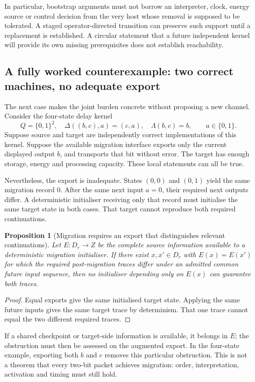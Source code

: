 \documentclass[11pt,a4paper]{article}
\newtheorem{proposition}[theorem]{Proposition}
\theoremstyle{definition}
\theoremstyle{remark}
\begin{document}
In particular, bootstrap arguments must not borrow an interpreter, clock, energy source or control decision from the very host whose removal is supposed to be tolerated. A staged operator-directed transition can preserve such support until a replacement is established. A circular statement that a future independent kernel will provide its own missing prerequisites does not establish reachability.

\subsection{A fully worked counterexample: two correct machines, no adequate export}\label{subsec:exportcase}
The next case makes the joint burden concrete without proposing a new channel. Consider the four-state delay kernel
\[
 Q=\{0,1\}^2,\quad \Delta((b,c),a)=(c,a),\quad \Lambda(b,c)=b,
 \qquad a\in\{0,1\}.
\]
Suppose source and target are independently correct implementations of this kernel. Suppose the available migration interface exports only the current displayed output $b$, and transports that bit without error. The target has enough storage, energy and processing capacity. These local statements can all be true.

Nevertheless, the export is inadequate. States $(0,0)$ and $(0,1)$ yield the same migration record $0$. After the same next input $a=0$, their required next outputs differ. A deterministic initialiser receiving only that record must initialise the same target state in both cases. That target cannot reproduce both required continuations.

\begin{proposition}[Migration requires an export that distinguishes relevant continuations]\label{prop:export}
Let $E:D_r\to Z$ be the complete source information available to a deterministic migration initialiser. If there exist $x,x'\in D_r$ with $E(x)=E(x')$ for which the required post-migration traces differ under an admitted common future input sequence, then no initialiser depending only on $E(x)$ can guarantee both traces.
\end{proposition}
\begin{proof}
Equal exports give the same initialised target state. Applying the same future inputs gives the same target trace by determinism. That one trace cannot equal the two different required traces.
\end{proof}
If a shared checkpoint or target-side information is available, it belongs in $E$; the obstruction must then be assessed on the augmented export. In the four-state example, exporting both $b$ and $c$ removes this particular obstruction. This is not a theorem that every two-bit packet achieves migration: order, interpretation, activation and timing must still hold.
\end{document}
